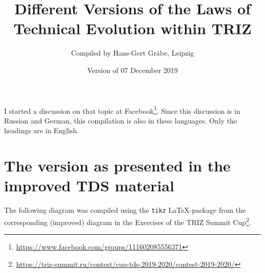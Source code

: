 \documentclass[11pt,a4paper]{article}
\title{Different Versions of the Laws of\\ Technical Evolution within TRIZ}
\author{Compiled by Hans-Gert Gräbe, Leipzig}
\date{Version of 07 December 2019}
\begin{document}
\maketitle

I started a discussion on that topic at
Facebook\footnote{\url{https://www.facebook.com/groups/111602085556371}}.
Since this discussion is in Russian and German, this compilation is also in
these languages. Only the headings are in English.

\section*{The version as presented in the improved TDS material}

The following diagram was compiled using the \texttt{tikz} \LaTeX-package from
the corresponding (improved) diagram in the Exercises of the TRIZ Summit
Cup\footnote{\url{https://triz-summit.ru/contest/cup-tds-2019-2020/contest-2019-2020/}}.
\end{document}
